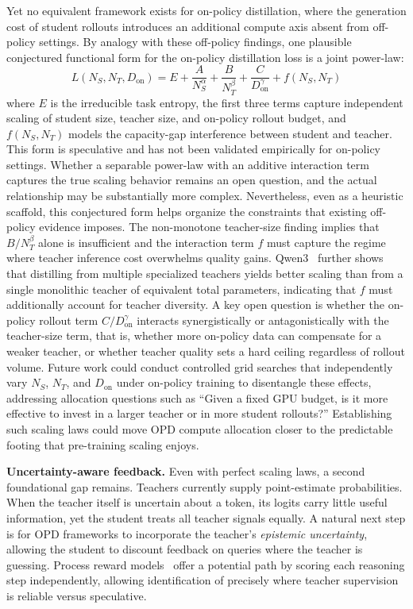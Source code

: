 \documentclass{article} %
\begin{document}
Yet no equivalent framework exists for on-policy distillation, where the generation cost of student rollouts introduces an additional compute axis absent from off-policy settings. By analogy with these off-policy findings, one plausible conjectured functional form for the on-policy distillation loss is a joint power-law:
\begin{equation}
    L(N_S, N_T, D_{\text{on}}) = E + \frac{A}{N_S^\alpha} + \frac{B}{N_T^\beta} + \frac{C}{D_{\text{on}}^\gamma} + f(N_S, N_T)
\end{equation}
where $E$ is the irreducible task entropy, the first three terms capture independent scaling of student size, teacher size, and on-policy rollout budget, and $f(N_S, N_T)$ models the capacity-gap interference between student and teacher. This form is speculative and has not been validated empirically for on-policy settings. Whether a separable power-law with an additive interaction term captures the true scaling behavior remains an open question, and the actual relationship may be substantially more complex. Nevertheless, even as a heuristic scaffold, this conjectured form helps organize the constraints that existing off-policy evidence imposes. The non-monotone teacher-size finding implies that $B/N_T^\beta$ alone is insufficient and the interaction term $f$ must capture the regime where teacher inference cost overwhelms quality gains. Qwen3~\citep{2505.09388} further shows that distilling from multiple specialized teachers yields better scaling than from a single monolithic teacher of equivalent total parameters, indicating that $f$ must additionally account for teacher diversity. A key open question is whether the on-policy rollout term $C/D_{\text{on}}^\gamma$ interacts synergistically or antagonistically with the teacher-size term, that is, whether more on-policy data can compensate for a weaker teacher, or whether teacher quality sets a hard ceiling regardless of rollout volume. Future work could conduct controlled grid searches that independently vary $N_S$, $N_T$, and $D_{\text{on}}$ under on-policy training to disentangle these effects, addressing allocation questions such as ``Given a fixed GPU budget, is it more effective to invest in a larger teacher or in more student rollouts?'' Establishing such scaling laws could move OPD compute allocation closer to the predictable footing that pre-training scaling enjoys.

\textbf{Uncertainty-aware feedback.} Even with perfect scaling laws, a second foundational gap remains. Teachers currently supply point-estimate probabilities. When the teacher itself is uncertain about a token, its logits carry little useful information, yet the student treats all teacher signals equally. A natural next step is for OPD frameworks to incorporate the teacher's \emph{epistemic uncertainty}, allowing the student to discount feedback on queries where the teacher is guessing. Process reward models~\citep{2305.20050} offer a potential path by scoring each reasoning step independently, allowing identification of precisely where teacher supervision is reliable versus speculative.
\end{document}
